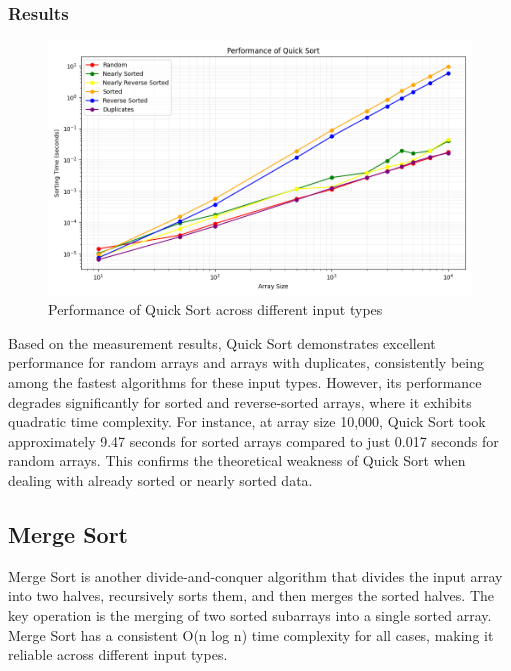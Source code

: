 \documentclass[a4paper,12pt]{article}
\begin{document}
\subsubsection{Results}
\label{sec:org59fbea2}
\begin{figure}[htbp]
\centering
\includegraphics[width=.9\linewidth]{sorting_performance_quick_sort.png}
\caption{\label{fig:org9660dbe}Performance of Quick Sort across different input types}
\end{figure}

Based on the measurement results, Quick Sort demonstrates excellent performance for random arrays and arrays with duplicates, consistently being among the fastest algorithms for these input types. However, its performance degrades significantly for sorted and reverse-sorted arrays, where it exhibits quadratic time complexity. For instance, at array size 10,000, Quick Sort took approximately 9.47 seconds for sorted arrays compared to just 0.017 seconds for random arrays. This confirms the theoretical weakness of Quick Sort when dealing with already sorted or nearly sorted data.
\subsection{Merge Sort}
\label{sec:orga2d20a6}
Merge Sort is another divide-and-conquer algorithm that divides the input array into two halves, recursively sorts them, and then merges the sorted halves. The key operation is the merging of two sorted subarrays into a single sorted array. Merge Sort has a consistent O(n log n) time complexity for all cases, making it reliable across different input types.
\end{document}
